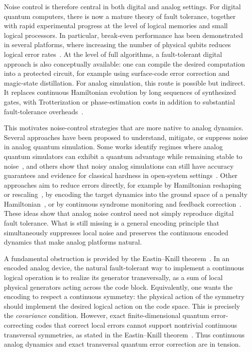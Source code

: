 \documentclass[10pt,twocolumn,superscriptaddress,aps,amsmath,amssymb,citeautoscript,floatfix,prx]{revtex4-2}
\newcounter{alg}
\theoremstyle{plain}
\theoremstyle{plain}
\theoremstyle{plain}
\theoremstyle{plain}
\theoremstyle{plain}
\theoremstyle{plain}
\begin{document}
Noise control is therefore central in both digital and analog settings. For digital quantum computers, there is now a mature theory of fault tolerance, together with rapid experimental progress at the level of logical memories and small logical processors. In particular, break-even performance has been demonstrated in several platforms, where increasing the number of physical qubits reduces logical error rates~\cite{Krinner2022,AcharyaGoogle2025,RyanAnderson2021,daSilvaPaetznick2024,Reichardt2024Tesseract,Bluvstein2024,Reichardt2024NeutralAtom}. At the level of full algorithms, a fault-tolerant digital approach is also conceptually available: one can compile the desired computation into a protected circuit, for example using surface-code error correction and magic-state distillation. For analog simulation, this route is possible but indirect. It replaces continuous Hamiltonian evolution by long sequences of synthesized gates, with Trotterization or phase-estimation costs in addition to substantial fault-tolerance overheads~\cite{Reiher2017ReactionMechanisms,Kivlichan2020Trotter}.

This motivates noise-control strategies that are more native to analog dynamics. Several approaches have been proposed to understand, mitigate, or suppress noise in analog quantum simulation. Some works identify regimes where analog quantum simulators can exhibit a quantum advantage while remaining stable to noise~\cite{Trivedi2024AnalogStability}, and others show that noisy analog simulations can still have accuracy guarantees and evidence for classical hardness in open-system settings~\cite{Kashyap2025AnalogOpenSimulation}. Other approaches aim to reduce errors directly, for example by Hamiltonian reshaping or rescaling~\cite{Guo2025HamiltonianReshaping}, by encoding the target dynamics into the ground space of a penalty Hamiltonian~\cite{Cao2024RobustAnalog}, or by continuous syndrome monitoring and feedback correction~\cite{Atalaya2021ContinuousQEC}. These ideas show that analog noise control need not simply reproduce digital fault tolerance. What is still missing is a general encoding principle that simultaneously suppresses local noise and preserves the continuous encoded dynamics that make analog platforms natural.

A fundamental obstruction is provided by the Eastin--Knill theorem~\cite{Eastin2009}. In an encoded analog device, the natural fault-tolerant way to implement a continuous logical operation is to realize its generator transversally, as a sum of local physical generators acting across the code block. Equivalently, one wants the encoding to respect a continuous symmetry: the physical action of the symmetry should implement the desired logical action on the code space. This is precisely the \textit{covariance} condition. However, exact finite-dimensional quantum error-correcting codes that correct local errors cannot support nontrivial continuous transversal symmetries, as stated in the Eastin--Knill theorem~\cite{Eastin2009}. Thus continuous analog dynamics and exact transversal quantum error correction are in tension.
\end{document}
